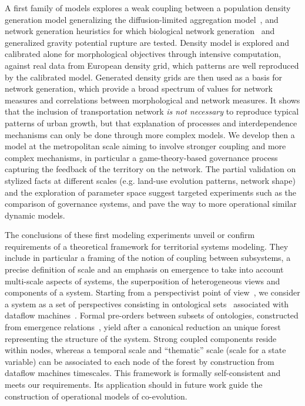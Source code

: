 A first family of models explores a weak coupling between a population density generation model generalizing the diffusion-limited aggregation model~\citep{batty2006hierarchy}, and network generation heuristics for which biological network generation~\citep{TeroAl10} and generalized gravity potential rupture are tested. Density model is explored and calibrated alone for morphological objectives through intensive computation, against real data from European density grid, which patterns are well reproduced by the calibrated model. Generated density grids are then used as a basis for network generation, which provide a broad spectrum of values for network measures and correlations between morphological and network measures. It shows that the inclusion of transportation network \emph{is not necessary} to reproduce typical patterns of urban growth, but that explanation of processes and interdependence mechanisms can only be done through more complex models. We develop then a model at the metropolitan scale aiming to involve stronger coupling and more complex mechanisms, in particular a game-theory-based governance process capturing the feedback of the territory on the network. The partial validation on stylized facts at different scales (e.g. land-use evolution patterns, network shape) and the exploration of parameter space suggest targeted experiments such as the comparison of governance systems, and pave the way to more operational similar dynamic models.


The conclusions of these first modeling experiments unveil or confirm requirements of a theoretical framework for territorial systems modeling. They include in particular a framing of the notion of coupling between subsystems, a precise definition of scale and an emphasis on emergence to take into account multi-scale aspects of systems, the superposition of heterogeneous views and components of a system. Starting from a perspectivist point of view~\citep{giere2010scientific}, we consider a system as a set of perspectives consisting in ontological sets~\citep{livet2010} associated with dataflow machines~\citep{golden2012modeling}. Formal pre-orders between subsets of ontologies, constructed from emergence relations~\citep{bedau2002downward}, yield after a canonical reduction an unique forest representing the structure of the system. Strong coupled components reside within nodes, whereas a temporal scale and ``thematic'' scale (scale for a state variable) can be associated to each node of the forest by construction from dataflow machines timescales. This framework is formally self-consistent and meets our requirements. Its application should in future work guide the construction of operational models of co-evolution.





\tiny

\begin{multicols}{2}






\end{multicols}


